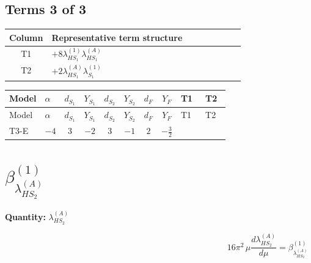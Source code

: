 \documentclass[8pt]{article}
\begin{document}
\begin{landscape}
\subsection*{Terms 3 of 3}
\begin{center}
\begin{tabular}{@{}c >{\raggedright\arraybackslash}p{0.82\linewidth}@{}}
\toprule
Column & Representative term structure \\
\midrule
T1 & \(\displaystyle +8 {\lambda_{HS_1}^{(1)}} {\lambda_{HS_1}^{(A)}}\) \\
\midrule
T2 & \(\displaystyle +2 {\lambda_{HS_1}^{(A)}} {\lambda_{S_1}^{(1)}}\) \\
\midrule
\bottomrule
\end{tabular}
\end{center}
\smallskip
\tiny
\begin{longtable}{@{}llcccccc >{\raggedright\arraybackslash}p{0.21\linewidth} >{\raggedright\arraybackslash}p{0.21\linewidth}@{}}
\toprule
Model & $\alpha$ & $d_{S_1}$ & $Y_{S_1}$ & $d_{S_2}$ & $Y_{S_2}$ & $d_F$ & $Y_F$ & T1 & T2 \\
\midrule
\endfirsthead
\toprule
Model & $\alpha$ & $d_{S_1}$ & $Y_{S_1}$ & $d_{S_2}$ & $Y_{S_2}$ & $d_F$ & $Y_F$ & T1 & T2 \\
\midrule
\endhead
T3-E & $-4$ & $3$ & $-2$ & $3$ & $-1$ & $2$ & $-\frac{3}{2}$ & \scriptsize\adjustbox{max width=\linewidth}{$\begin{gathered} +8 {\lambda_{HS_1}^{(1)}} {\lambda_{HS_1}^{(A)}}\end{gathered}$} & \scriptsize\adjustbox{max width=\linewidth}{$\begin{gathered} +2 {\lambda_{HS_1}^{(A)}} {\lambda_{S_1}^{(1)}}\end{gathered}$} \\
\midrule
\bottomrule
\end{longtable}
\clearpage
\section*{$\beta_{\lambda_{HS_2}^{(A)}}^{(1)}$}
\noindent\textbf{Quantity: }$\lambda_{HS_2}^{(A)}$\par\smallskip
\[16\pi^2\,\mu\frac{d \lambda_{HS_2}^{(A)}}{d\mu}=\beta_{\lambda_{HS_2}^{(A)}}^{(1)}\]

\end{landscape}
\end{document}
